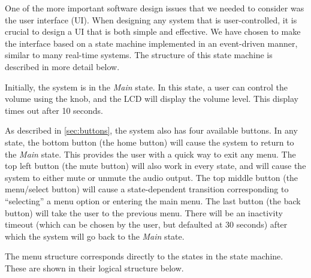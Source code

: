 One of the more important software design issues that we needed to consider was the user interface (UI). When designing any system that is user-controlled, it is crucial to design a UI that is both simple and effective. We have chosen to make the interface based on a state machine implemented in an event-driven manner, similar to many real-time systems. The structure of this state machine is described in more detail below.

Initially, the system is in the \emph{Main} state. In this state, a user can control the volume using the knob, and the LCD will display the volume level. This display times out after 10 seconds.

As described in \autoref{sec:buttons}, the system also has four available buttons. In any state, the bottom button (the home button) will cause the system to return to the \emph{Main} state. This provides the user with a quick way to exit any menu. The top left button (the mute button) will also work in every state, and will cause the system to either mute or unmute the audio output. The top middle button (the menu/select button) will cause a state-dependent transition corresponding to ``selecting'' a menu option or entering the main menu. The last button (the back button) will take the user to the previous menu. There will be an inactivity timeout (which can be chosen by the user, but defaulted at 30 seconds) after which the system will go back to the \emph{Main} state.

The menu structure corresponds directly to the states in the state machine. These are shown in their logical structure below.

